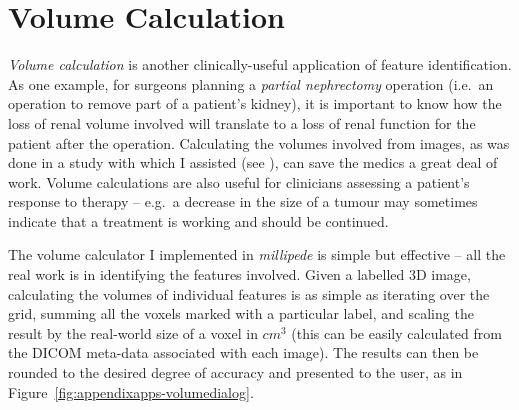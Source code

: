 \section{Volume Calculation}

\emph{Volume calculation} is another clinically-useful application of feature identification. As one example, for surgeons planning a \emph{partial nephrectomy} operation (i.e.~an operation to remove part of a patient's kidney), it is important to know how the loss of renal volume involved will translate to a loss of renal function for the patient after the operation. Calculating the volumes involved from images, as was done in a study with which I assisted (see \cite{pbgmvc09}), can save the medics a great deal of work. Volume calculations are also useful for clinicians assessing a patient's response to therapy -- e.g.~a decrease in the size of a tumour may sometimes indicate that a treatment is working and should be continued.

The volume calculator I implemented in \emph{millipede} is simple but effective -- all the real work is in identifying the features involved. Given a labelled 3D image, calculating the volumes of individual features is as simple as iterating over the grid, summing all the voxels marked with a particular label, and scaling the result by the real-world size of a voxel in $\mathit{cm}^3$ (this can be easily calculated from the DICOM meta-data associated with each image). The results can then be rounded to the desired degree of accuracy and presented to the user, as in Figure~\ref{fig:appendixapps-volumedialog}.

\vspace{1cm}
